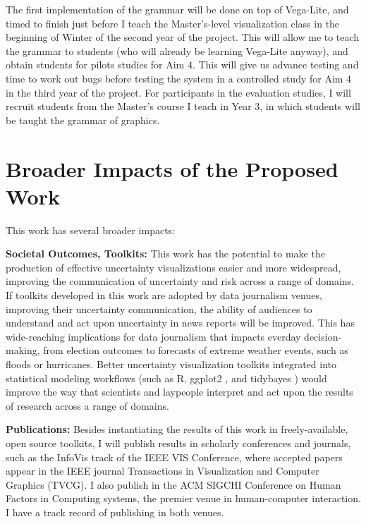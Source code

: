 \documentclass[11pt]{article}
\begin{document}
The first implementation of the grammar will be done on top of Vega-Lite, and timed to finish just before I teach the Master's-level visualization class in the beginning of Winter of the second year of the project. This will allow me to teach the grammar to students (who will already be learning Vega-Lite anyway), and obtain students for pilots studies for Aim 4. This will give us advance testing and time to work out bugs before testing the system in a controlled study for Aim 4 in the third year of the project. For participants in the evaluation studies, I will recruit students from the Master's course I teach in Year 3, in which students will be taught the grammar of graphics.

\section{Broader Impacts of the Proposed Work}

\noindent This work has several broader impacts:

\noindent\textbf{Societal Outcomes, Toolkits:}
This work has the potential to make the production of effective uncertainty visualizations easier and more widespread, improving the communication of uncertainty and risk across a range of domains. If toolkits developed in this work are adopted by data journalism venues, improving their uncertainty communication, the ability of audiences to understand and act upon uncertainty in news reports will be improved. This has wide-reaching implications for data journalism that impacts everday decision-making, from election outcomes to forecasts of extreme weather events, such as floods or hurricanes. Better uncertainty visualization toolkits integrated into statistical modeling workflows (such as R, ggplot2 \cite{wickham2016ggplot2}, and tidybayes \cite{kay2017tidybayes}) would improve the way that scientists and laypeople interpret and act upon the results of research across a range of domains.

\noindent\textbf{Publications:}
Besides instantiating the results of this work in freely-available, open source toolkits, I will publish results in scholarly conferences and journals, such as the InfoVis track of the IEEE VIS Conference, where accepted papers appear in the IEEE journal Transactions in Visualization and Computer Graphics (TVCG). I also publish in the ACM SIGCHI Conference on Human Factors in Computing systems, the premier venue in human-computer interaction.
I have a track record of publishing in both venues.
\end{document}
